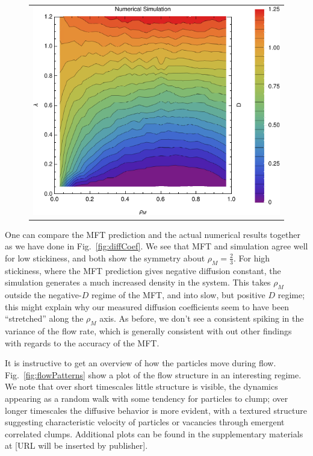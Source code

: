 \begin{figure}[h!]
\begin{center}
\begin{tabular}{c}
    \includegraphics[width=0.98\linewidth]{../tex-src/images/newDataFlow}
    \end{tabular}
\end{center}
    \vspace{-2em}
\end{figure}

One can compare the MFT prediction and the actual numerical results together as we have done in Fig.~\ref{fig:diffCoef}. We see that MFT and simulation agree well for low stickiness, and both show the symmetry
about $\rho_M = \frac{2}{3}$. For high stickiness, where the MFT prediction gives negative diffusion constant, the simulation generates a much increased density in the system.  This takes $\rho_M$ outside the negative-$D$ regime of the MFT,
and into slow, but positive $D$ regime; this might explain why our measured diffusion coefficients seem to have been ``stretched'' along the $\rho_M$ axis. As before, we don't see a consistent spiking in the variance of the flow rate,
which is generally consistent with out other findings with
regards to the accuracy of the MFT.

It is instructive to get an overview of how the particles move during flow. Fig.~\ref{fig:flowPatterns} show a plot of the flow structure in an interesting regime.
We note that over short timescales little structure is visible, the dynamics appearing as a random walk with some tendency for particles to clump; over longer timescales the diffusive behavior is more evident, with a textured structure suggesting characteristic velocity of  particles or vacancies through emergent correlated clumps.
Additional plots can be found in the supplementary materials at [URL will be inserted by publisher].

